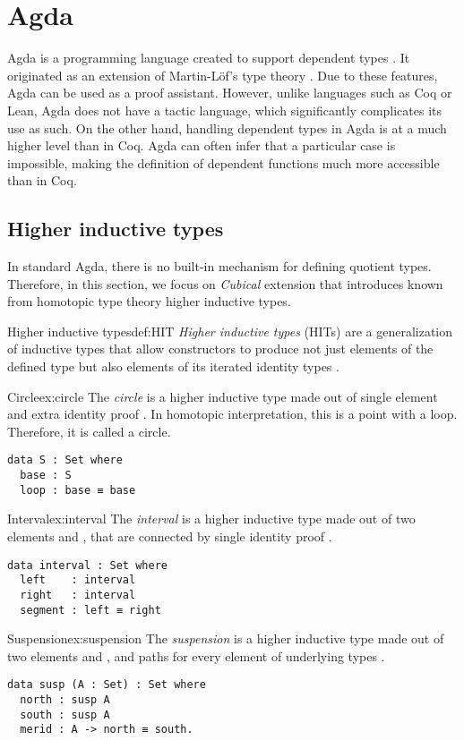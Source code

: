 \section{Agda}
Agda is a programming language created to support dependent types \cite{agda}. It originated as an extension of Martin-Löf's type theory \cite{MARTINLOF197573}. Due to these features, Agda can be used as a proof assistant. However, unlike languages such as Coq or Lean, Agda does not have a tactic language, which significantly complicates its use as such. On the other hand, handling dependent types in Agda is at a much higher level than in Coq. Agda can often infer that a particular case is impossible, making the definition of dependent functions much more accessible than in Coq.
\subsection{Higher inductive types}
In standard Agda, there is no built-in mechanism for defining quotient types. Therefore, in this section, we focus on \emph{Cubical} extension that introduces known from homotopic type theory higher inductive types.
\begin{defi}{Higher inductive types}{def:HIT}
\emph{Higher inductive types} (HITs) are a generalization of inductive types that allow constructors to produce not just elements of the defined type but also elements of its iterated identity types \cite{HoTT}.
\end{defi}
\begin{example}{Circle}{ex:circle}
The \emph{circle} is a higher inductive type made out of single element  and extra identity proof  \cite{HoTT}. In homotopic interpretation, this is a point with a loop. Therefore, it is called a circle.
\begin{verbatim}
data S : Set where
  base : S
  loop : base ≡ base
\end{verbatim}
\end{example}
\begin{example}{Interval}{ex:interval}
The \emph{interval} is a higher inductive type made out of two elements  and , that are connected by single identity proof  \cite{HoTT}.
\begin{verbatim}
data interval : Set where
  left    : interval
  right   : interval
  segment : left ≡ right
\end{verbatim}
\end{example}
\begin{example}{Suspension}{ex:suspension}
The \emph{suspension} is a higher inductive type made out of two elements  and , and paths for every element of underlying types \cite{HoTT}.
\begin{verbatim}
data susp (A : Set) : Set where
  north : susp A
  south : susp A
  merid : A -> north ≡ south.
\end{verbatim}
\end{example}
